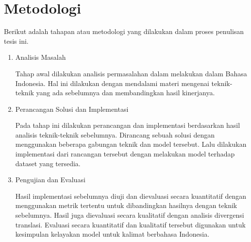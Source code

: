 \section{Metodologi}

Berikut adalah tahapan atau metodologi yang dilakukan dalam proses penulisan tesis ini.

\begin{enumerate}
  \item Analisis Masalah

  Tahap awal dilakukan analisis permasalahan dalam melakukan \amrparsing{} dalam Bahasa Indonesia.
  Hal ini dilakukan dengan mendalami materi mengenai teknik-teknik \amrparsing{} yang ada sebelumnya dan membandingkan hasil kinerjanya.

  \item Perancangan Solusi dan Implementasi

  Pada tahap ini dilakukan perancangan dan implementasi berdasarkan hasil analisis teknik-teknik \amrparsing{} sebelumnya.
  Dirancang sebuah solusi dengan menggunakan beberapa gabungan teknik dan model tersebut.
  Lalu dilakukan implementasi dari rancangan tersebut dengan melakukan  model terhadap dataset yang tersedia.

  \item Pengujian dan Evaluasi

  Hasil implementasi sebelumnya diuji dan dievaluasi secara kuantitatif dengan menggunakan metrik tertentu untuk dibandingkan hasilnya dengan teknik sebelumnya.
  Hasil \amrparsing{} juga dievaluasi secara kualitatif dengan analisis divergensi translasi.
  Evaluasi secara kuantitatif dan kualitatif tersebut digunakan untuk kesimpulan kelayakan model \amrparsing{}  untuk kalimat berbahasa Indonesia.

\end{enumerate}
